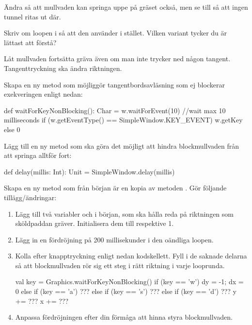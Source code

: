 \Task
Ändra så att mullvaden kan springa uppe på gräset också, men se till så att ingen tunnel ritas ut där.

\Task
Skriv om loopen i  så att den använder  i stället. Vilken variant tycker du är lättast att förstå?

\Task
Låt mullvaden fortsätta gräva även om man inte trycker ned någon tangent. Tangenttryckning ska ändra riktningen. 

\Subtask
Skapa en ny metod  som möjliggör tangentbordsavläsning som ej blockerar exekveringen enligt nedan:  

\begin{Code}
  def waitForKeyNonBlocking(): Char  = {
    w.waitForEvent(10) //wait max 10 milliseconds
    if (w.getEventType() == SimpleWindow.KEY_EVENT) w.getKey else 0
  }
\end{Code}

\Subtask
Lägg till en ny metod  som ska göra det möjligt att hindra blockmullvaden från att springa alltför fort:
\begin{Code}
def delay(millis: Int): Unit = SimpleWindow.delay(millis)
\end{Code}


\Subtask
Skapa en ny metod  som från början är en kopia av metoden . Gör följande tillägg/ändringar:
\begin{enumerate}

\item Lägg till två variabler  och  i början, som ska hålla reda på riktningen som sköldpaddan gräver. Initialisera dem till  respektive {1}.

\item Lägg in en fördröjning på 200 millisekunder i den oändliga loopen.

\item Kolla efter knapptryckning enligt nedan kodskellett. Fyll i de saknade delarna så att blockmullvaden rör sig ett steg i rätt riktning i varje looprunda.
\begin{Code}
      val key = Graphics.waitForKeyNonBlocking()
      if      (key == 'w') { dy = -1; dx = 0 }
      else if (key == 'a') { ??? }
      else if (key == 's') { ??? }
      else if (key == 'd') { ??? }
      y += ???
      x += ???
\end{Code}

\item Anpassa fördröjningen efter din förmåga att hinna styra blockmullvaden.

\end{enumerate}

